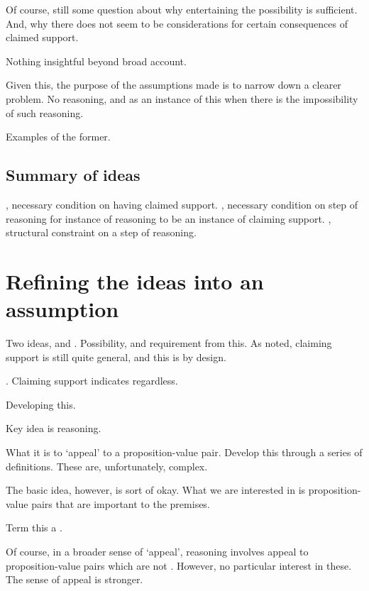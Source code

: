 \begin{note}
  Of course, still some question about why entertaining the possibility is sufficient.
  And, why there does not seem to be considerations for certain consequences of claimed support.

  Nothing insightful beyond broad account.

  Given this, the purpose of the assumptions made is to narrow down a clearer problem.
  No reasoning, and as an instance of this when there is the impossibility of such reasoning.

  Examples of the former.
\end{note}

\subsection{Summary of ideas}
\label{sec:summary-1}

\begin{note}
  \ideaCSA{}, necessary condition on having claimed support.
  \ideaCSB{}, necessary condition on step of reasoning for instance of reasoning to be an instance of claiming support.
  \ideaCSC{}, structural constraint on a step of reasoning.
\end{note}

\section{Refining the ideas into an assumption}
\label{sec:assumpt-from-ideas}

\begin{note}
  Two ideas, \ideaCSA{} and \ideaCSB{}.
  Possibility, and requirement from this.
  As noted, claiming support is still quite general, and this is by design.
\end{note}

\begin{note}
  \ideaCSB{}.
  Claiming support indicates regardless.

  Developing this.

  Key idea is reasoning.

  What it is to `appeal' to a proposition-value pair.
  Develop this through a series of definitions.
  These are, unfortunately, complex.

  The basic idea, however, is sort of okay.
  What we are interested in is proposition-value pairs that are important to the premises.

  Term this a \requ{}.

  Of course, in a broader sense of `appeal', reasoning involves appeal to proposition-value pairs which are not .
  However, no particular interest in these.
  The sense of appeal is stronger.
\end{note}

